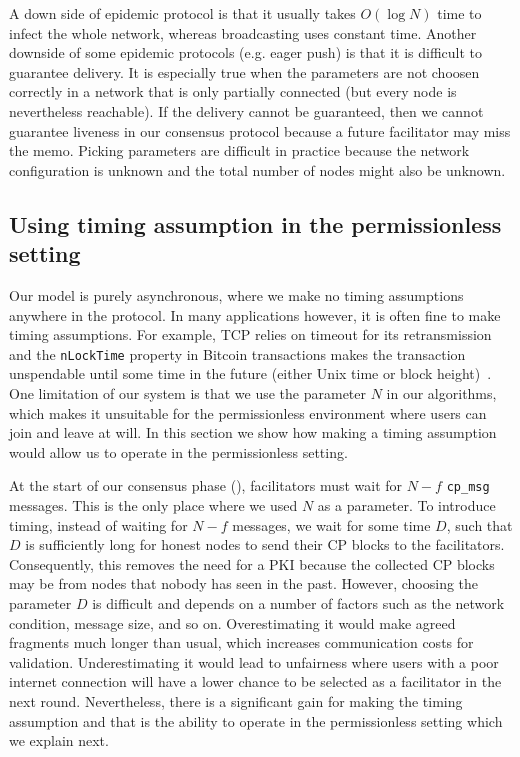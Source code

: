 A down side of epidemic protocol is that it usually takes $O(\log N)$ time to infect the whole network,
whereas broadcasting uses constant time.
Another downside of some epidemic protocols (e.g. eager push) is that it is difficult to guarantee delivery.
It is especially true when the parameters are not choosen correctly in a network that is only partially connected (but every node is nevertheless reachable).
If the delivery cannot be guaranteed, 
then we cannot guarantee liveness in our consensus protocol because a future facilitator may miss the memo.
Picking parameters are difficult in practice because the network configuration is unknown and the total number of nodes might also be unknown.


\subsection{Using timing assumption in the permissionless setting}
\label{sec:permissionless}
Our model is purely asynchronous, where we make no timing assumptions anywhere in the protocol.
In many applications however, it is often fine to make timing assumptions.
For example, TCP relies on timeout for its retransmission and the \texttt{nLockTime} property in Bitcoin transactions makes the transaction unspendable until some time in the future (either Unix time or block height)~\cite{bitcoindevguide}.
One limitation of our system is that we use the parameter $N$ in our algorithms, which makes it unsuitable for the permissionless environment where users can join and leave at will.
In this section we show how making a timing assumption would allow us to operate in the permissionless setting.

At the start of our consensus phase (), facilitators must wait for $N-f$ \texttt{cp\_msg} messages.
This is the only place where we used $N$ as a parameter.
To introduce timing, instead of waiting for $N-f$ messages, we wait for some time $D$,
such that $D$ is sufficiently long for honest nodes to send their CP blocks to the facilitators.
Consequently, this removes the need for a PKI because the collected CP blocks may be from nodes that nobody has seen in the past.
However, choosing the parameter $D$ is difficult and depends on a number of factors such as the network condition, message size, and so on.
Overestimating it would make agreed fragments much longer than usual, which increases communication costs for validation.
Underestimating it would lead to unfairness where users with a poor internet connection will have a lower chance to be selected as a facilitator in the next round.
Nevertheless, there is a significant gain for making the timing assumption and that is the ability to operate in the permissionless setting which we explain next.

